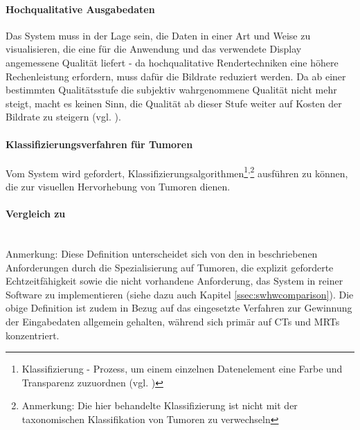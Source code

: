 \documentclass[pdftex,a4paper,titlepage,12pt]{scrartcl}
\newtheorem[L]{boxedDefinition}{Definition}
\newcommand{\paranl}{$~~$\\}
\begin{document}
\paragraph{Hochqualitative Ausgabedaten} Das System muss in der Lage sein, die Daten in einer Art und Weise zu visualisieren, die eine für die Anwendung und das verwendete Display angemessene Qualität liefert - da hochqualitative Rendertechniken eine höhere Rechenleistung erfordern, muss dafür die Bildrate reduziert werden. Da ab einer bestimmten Qualitätsstufe die subjektiv wahrgenommene Qualität nicht mehr steigt, macht es keinen Sinn, die Qualität ab dieser Stufe weiter auf Kosten der Bildrate zu steigern (vgl. \cite[Kapitel 3.3, Seite 5]{Kutter2008}).

\paragraph{Klassifizierungsverfahren für Tumoren}Vom System wird gefordert, Klassifizierungsalgorithmen\footnote{Klassifizierung - Prozess, um einem einzelnen Datenelement eine Farbe und Transparenz zuzuordnen (vgl. \cite[Kapitel 3.2.2, Seite 28]{Bruckner2004})}\textsuperscript{,}\footnote{Anmerkung: Die hier behandelte Klassifizierung ist nicht mit der taxonomischen Klassifikation von Tumoren zu verwechseln} ausführen zu können, die zur visuellen Hervorhebung von Tumoren dienen.

\paragraph{Vergleich zu \cite[Kapitel 3.1.1, Seite 17f.]{Bruckner2004}}\paranl\label{p:bru04comparison}
Anmerkung: Diese Definition unterscheidet sich von den in \cite[Kapitel 3.1.1, Seite 17]{Bruckner2004} beschriebenen Anforderungen durch die Spezialisierung auf Tumoren, die explizit geforderte Echtzeitfähigkeit sowie die nicht vorhandene Anforderung, das System in reiner Software zu implementieren (siehe dazu auch Kapitel \vref{ssec:swhwcomparison}). Die obige Definition ist zudem in Bezug auf das eingesetzte Verfahren zur Gewinnung der Eingabedaten allgemein gehalten, während \cite{Bruckner2004} sich primär auf CTs und MRTs konzentriert.
\end{document}
